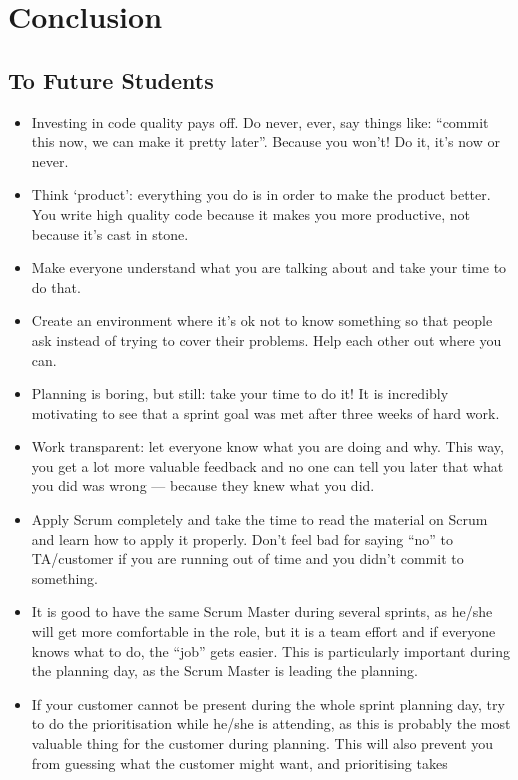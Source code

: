 \documentclass[11pt,a4paper]{report}
\begin{document}
\chapter{Conclusion}
\section*{To Future Students}
\begin{itemize}
\item Investing in code quality pays off. Do never, ever, say things like:
  ``commit this now, we can make it pretty later''. Because you won't!  Do it,
  it's now or never.
\item Think `product': everything you do is in order to make the product better.
  You write high quality code because it makes you more productive, not because
  it's cast in stone.
\item Make everyone understand what you are talking about and take your time to
  do that.
\item Create an environment where it's ok not to know something so that people
  ask instead of trying to cover their problems. Help each other out where you
  can.
\item Planning is boring, but still: take your time to do it! It is incredibly
  motivating to see that a sprint goal was met after three weeks of hard work.
\item Work transparent: let everyone know what you are doing and why. This way,
  you get a lot more valuable feedback and no one can tell you later that what
  you did was wrong --- because they knew what you did.
\item Apply Scrum completely and take the time to read the material on Scrum and
  learn how to apply it properly. Don't feel bad for saying ``no'' to
  TA/customer if you are running out of time and you didn't commit to something.
\item It is good to have the same Scrum Master during several sprints, as he/she
  will get more comfortable in the role, but it is a team effort and if everyone
  knows what to do, the ``job'' gets easier. This is particularly important
  during the planning day, as the Scrum Master is leading the planning.
\item If your customer cannot be present during the whole sprint planning day,
  try to do the prioritisation while he/she is attending, as this is probably
  the most valuable thing for the customer during planning. This will also
  prevent you from guessing what the customer might want, and prioritising takes

\end{itemize}
\end{document}
